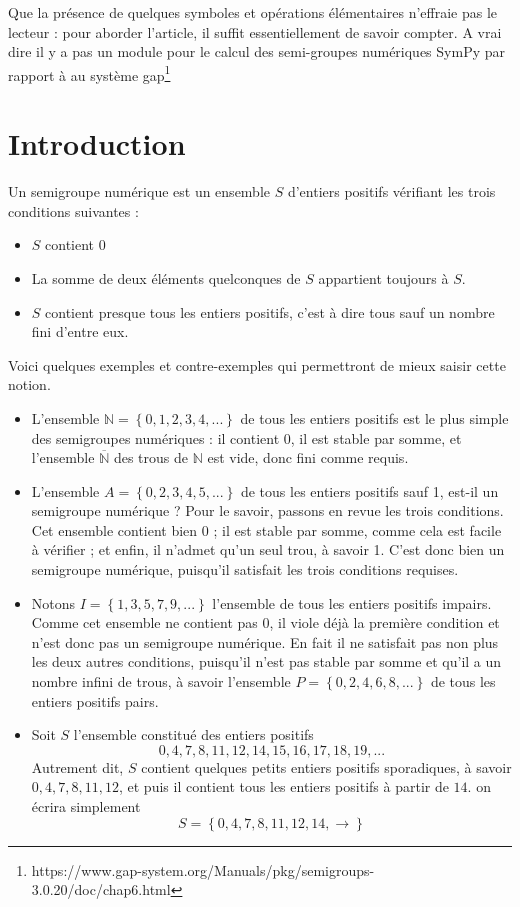 Que la présence de quelques symboles et opérations élémentaires n’effraie pas le lecteur : pour aborder l’article, il suffit essentiellement de savoir compter. A vrai dire il y a pas un module pour le calcul
des semi-groupes numériques SymPy par rapport à au système gap\footnote{https://www.gap-system.org/Manuals/pkg/semigroups-3.0.20/doc/chap6.html}
\section{Introduction}

\begin{definition}
 Un semigroupe numérique est un ensemble $S$ d’entiers positifs vérifiant les trois conditions suivantes :
 \begin{itemize}
   \item $S$ contient $0$
   \item La somme de deux éléments quelconques de $S$ appartient toujours à $S$.
   \item $S$ contient presque tous les entiers positifs, c’est à dire tous sauf un nombre fini d’entre eux.
 \end{itemize}
\end{definition}
Voici quelques exemples et contre-exemples qui permettront de mieux saisir cette notion.
\begin{example}
 \begin{itemize}
 
   \item L'ensemble $\mathbb{N}=\left\lbrace 0, 1, 2, 3, 4,... \right\rbrace$ de tous les entiers positifs est le plus simple    des semigroupes numériques : il contient $0$, il est stable par somme, et l’ensemble $\overline{\mathbb{N}}$ des trous de $\mathbb{N}$ est vide, donc fini comme requis.
   \item L’ensemble $A=\left\lbrace 0,2,3,4,5,...\right\rbrace$ de tous les entiers positifs sauf 1, est-il un semigroupe numérique ? Pour le savoir, passons en revue les trois conditions. Cet ensemble contient bien $0$ ; il est stable par somme, comme cela est facile à vérifier ; et enfin, il n’admet qu’un seul trou, à savoir 1. C’est donc bien un semigroupe numérique, puisqu’il satisfait les trois conditions requises.
   \item Notons $I=\left\lbrace 1,3,5,7,9,...\right\rbrace$ l’ensemble de tous les entiers positifs impairs. Comme cet ensemble ne contient pas $0$, il viole déjà la première condition et n’est donc pas un semigroupe numérique. En fait il ne satisfait pas non plus les deux autres conditions, puisqu’il n’est pas stable par somme et qu’il a un nombre infini de trous, à savoir l’ensemble $P=\left\lbrace 0,2,4,6,8,...\right\rbrace$ de tous les entiers positifs pairs.
   \item Soit $S$ l’ensemble constitué des entiers positifs 
     \[
       0,4,7,8,11,12,14,15,16,17,18,19,...
     \]
Autrement dit, $S$ contient quelques petits entiers positifs sporadiques, à savoir $0,4,7,8,11,12$, et puis il contient tous les entiers positifs à partir de $14$. on écrira simplement
 \[
 	S = \left\lbrace 0,4, 7, 8,11, 12, 14, \longrightarrow  \right\rbrace
 \]
 
 \end{itemize}
\end{example}